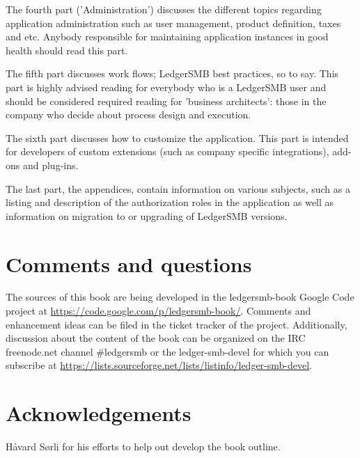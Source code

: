 \documentclass[10pt,a4paper]{book}
\begin{document}
The fourth part ('Administration') discusses the different topics
regarding application administration such as user management, product definition, taxes and etc.
Anybody responsible for maintaining application instances in good health should read this part.

The fifth part discusses work flows; LedgerSMB best practices, so to say. This part is highly advised
reading for everybody who is a LedgerSMB user and should be considered required reading for 'business
architects': those in the company who decide about process design and execution.

The sixth part discusses how to customize the application. This part is intended for developers of
custom extensions (such as company specific integrations), add-ons and plug-ins.

The last part, the appendices, contain information on various subjects, such as a listing and description
of the authorization roles in the application as well as information on migration to or upgrading of
LedgerSMB versions.


\section*{Comments and questions}
\label{sec-comments}

The sources of this book are being developed in the ledgersmb-book Google Code project at
\url{https://code.google.com/p/ledgersmb-book/}. Comments and enhancement ideas can be filed
in the ticket tracker of the project. Additionally, discussion about the content of the book
can be organized on the IRC freenode.net channel \#ledgersmb or the ledger-smb-devel for which
you can subscribe at \url{https://lists.sourceforge.net/lists/listinfo/ledger-smb-devel}.



\section*{Acknowledgements}
\label{sec-acknowledgements}

H{\aa}vard S{\o}rli for his efforts to help out develop the book outline.








\end{document}
